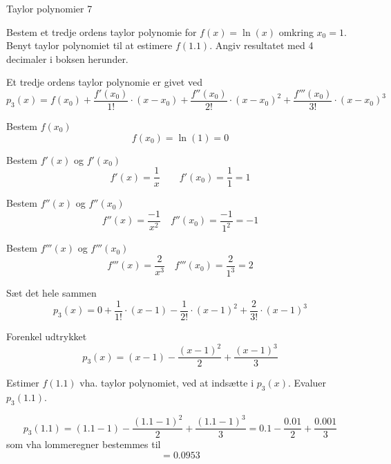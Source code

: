 \documentclass{article}
\begin{document}
\begin{exercise}{Taylor polynomier 7}
	
	Bestem et tredje ordens taylor polynomie for $f(x) =\ln(x)$ 
	omkring $x_0 = 1$.
	Benyt taylor polynomiet til at estimere $f(1.1)$.
	Angiv resultatet med 4 decimaler i boksen herunder.
	
	\hint
	Et tredje ordens taylor polynomie 
	er givet ved
	\[
	p_3(x) = f(x_0) + \frac{f'(x_0)}{1!} \cdot (x - x_0)
	+ \frac{f''(x_0)}{2!} \cdot (x - x_0)^2
	+ \frac{f'''(x_0)}{3!} \cdot (x - x_0)^3
	\]
	
	
	\hint
	Bestem $f(x_0)$
	\[
	f(x_0) = \ln(1) = 0
	\]
	
	\hint
	Bestem $f'(x)$ og $f'(x_0)$
	\[
	f'(x) = \frac{1}{x} \qquad f'(x_0) = \frac{1}{1} = 1
	\]
	
	\hint
	Bestem $f''(x)$ og $f''(x_0)$
	\[
	f''(x) =\frac{-1}{x^2}  \quad f''(x_0) = \frac{-1}{1^2} = -1
	\]
	
	\hint
	Bestem $f'''(x)$ og $f'''(x_0)$
	\[
	f'''(x) =\frac{2}{x^3}  \quad f'''(x_0) = \frac{2}{1^3} = 2
	\]
	
	\hint
	Sæt det hele sammen
	\[
	p_3(x) = 0 + \frac{1}{1!} \cdot (x-1) - \frac{1}{2!} \cdot (x-1)^2 + \frac{2}{3!} \cdot (x-1)^3
	\]
	
	\hint
	Forenkel udtrykket
	\[
	p_3(x) = (x-1) - \frac{(x-1)^2}{2} + \frac{(x-1)^3}{3}
	\]
	
	\hint
	Estimer $f(1.1)$ vha. taylor polynomiet, ved at indsætte i $p_3(x)$.
	Evaluer $p_3(1.1)$.
	
	\hint
	\[
	p_3(1.1) = (1.1 - 1) - \frac{(1.1 - 1)^2}{2} + \frac{(1.1 - 1)^3}{3} = 0.1 - \frac{0.01}{2} + \frac{0.001}{3} 
	\]
	som vha lommeregner bestemmes til
	\[
	= 0.0953
	\]
\end{exercise}
\end{document}
